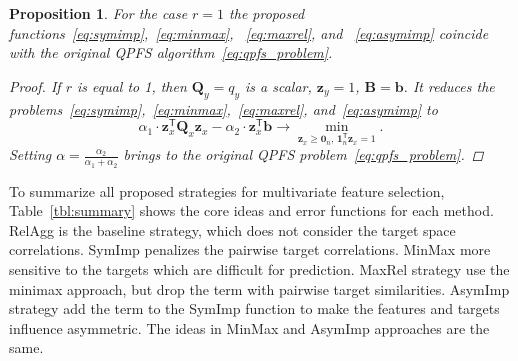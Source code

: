 \documentclass[12pt,twoside]{article}
\newtheorem{proposition}{Proposition}
\theoremstyle{definition}
\newcommand{\bz}{\mathbf{z}}
\newcommand{\bb}{\mathbf{b}}
\newcommand{\bB}{\mathbf{B}}
\newcommand{\bQ}{\mathbf{Q}}
\newcommand{\T}{\mathsf{T}}
\newcommand{\bOne}{\boldsymbol{1}}
\newcommand{\bZero}{\boldsymbol{0}}
\begin{document}
\begin{proposition}
	For the case $r=1$ the proposed functions~\eqref{eq:symimp},~\eqref{eq:minmax}, ~\eqref{eq:maxrel}, and ~\eqref{eq:asymimp} coincide with the original QPFS algorithm~\eqref{eq:qpfs_problem}.
	
	\begin{proof}
		If $r$ is equal to 1, then $\bQ_y = q_y$ is a scalar, $\bz_y = 1$, $\bB = \bb$. It reduces the problems~\eqref{eq:symimp},~\eqref{eq:minmax},~\eqref{eq:maxrel}, and~\eqref{eq:asymimp} to
		\begin{equation*}
		\alpha_1 \cdot \bz_x^{\T} \bQ_x \bz_x - \alpha_2 \cdot \bz_x^{\T} \bb \rightarrow \min_{\bz_x \geq \bZero_n, \, \bOne_n^{\T}\bz_x=1} .
		\end{equation*}
		Setting $\alpha = \frac{\alpha_2}{\alpha_1 + \alpha_2}$ brings to the original QPFS problem~\eqref{eq:qpfs_problem}.
	\end{proof}
\end{proposition}

To summarize all proposed strategies for multivariate feature selection, Table~\ref{tbl:summary} shows the core ideas and error functions for each method. 
RelAgg is the baseline strategy, which does not consider the target space correlations.
SymImp penalizes the pairwise target correlations.
MinMax more sensitive to the targets which are difficult for prediction.
MaxRel strategy use the minimax approach, but drop the term with pairwise target similarities.
AsymImp strategy add the term to the SymImp function to make the features and targets influence asymmetric. 
The ideas in MinMax and AsymImp approaches are the same. 
\end{document}
